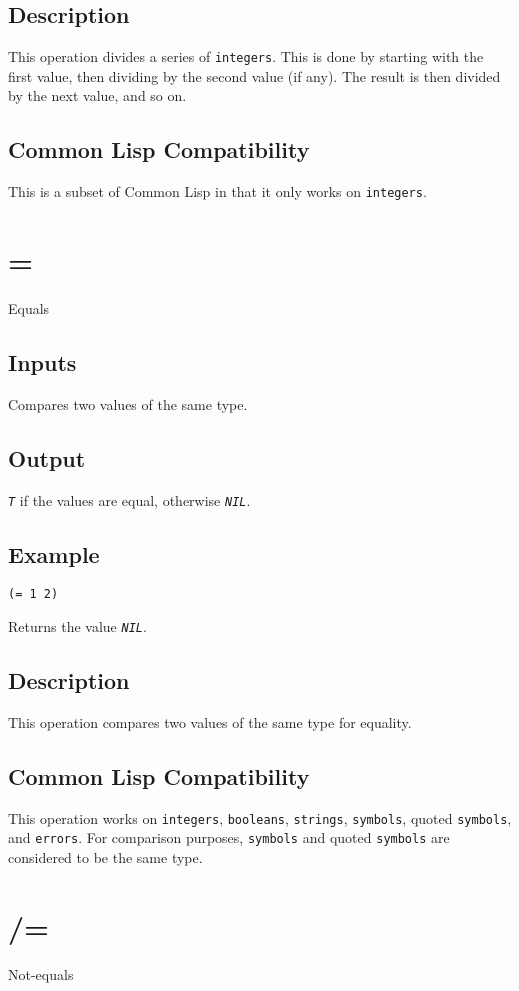 \documentclass[10pt, openany]{book}
\newcommand{\constant}[1]{\emph{\texttt{#1}}}
\newcommand{\datatype}[1]{\texttt{#1}}
\newcommand{\cl}{Common Lisp}
\begin{document}
\subsection{Description}
This operation divides a series of \datatype{integers}.  This is done by starting with the first value, then dividing by the second value (if any).  The result is then divided by the next value, and so on.
\subsection{Common Lisp Compatibility}
This is a subset of \cl{} in that it only works on \datatype{integers}.

\section{=}
Equals
\subsection{Inputs}
Compares two values of the same type.
\subsection{Output}
\constant{T} if the values are equal, otherwise \constant{NIL}.
\subsection{Example}
\begin{lstlisting}
(= 1 2)
\end{lstlisting}
Returns the value \constant{NIL}.
\subsection{Description}
This operation compares two values of the same type for equality.
\subsection{Common Lisp Compatibility}
This operation works on \datatype{integers}, \datatype{booleans}, \datatype{strings}, \datatype{symbols}, quoted \datatype{symbols}, and \datatype{errors}.  For comparison purposes, \datatype{symbols} and quoted \datatype{symbols} are considered to be the same type.

\section{/=}
Not-equals
\end{document}
